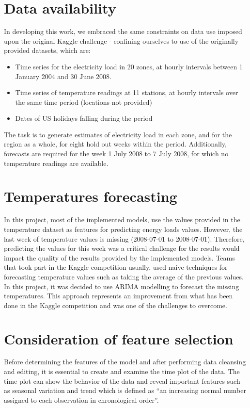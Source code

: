 \documentclass{article} %
\begin{document}
\section*{Data availability}
In developing this work, we embraced the same constraints on data use imposed upon the original Kaggle challenge - confining ourselves to use of the originally provided datasets, which are:
\begin{itemize}
\item Time series for the electricity load in 20 zones, at hourly intervals between 1 January 2004 and 30 June 2008.
\item Time series of temperature readings at 11 stations, at hourly intervals over the same time period (locations not provided)
\item Dates of US holidays falling during the period
\end{itemize}
The task is to generate estimates of electricity load in each zone, and for the region as a whole, for eight hold out weeks within the period.  Additionally, forecasts are required for the week 1 July 2008 to 7 July 2008, for which no temperature readings are available.

\section*{Temperatures forecasting}
In this project, most of the implemented models, use the values provided in the temperature dataset as features for predicting energy loads values. However, the last week of temperature values is missing (2008-07-01 to 2008-07-01). Therefore, predicting the values for this week was a critical challenge for the results would impact the quality of the results provided by the implemented models.
Teams that took part in the Kaggle competition usually, used naive techniques for forecasting temperature values such as taking the average of the previous values. In this project, it was decided to use ARIMA modelling to forecast the missing temperatures. This approach represents an improvement from what has been done in the Kaggle competition and was one of the challenges to overcome.

\section*{Consideration of feature selection}
Before determining the features of the model and after performing data cleansing and editing, it is essential to create and examine the time plot of the data. The time plot can show the behavior of the data and reveal important features such as seasonal variation and trend which is defined as “an increasing normal number assigned to each observation in chronological order”.
\end{document}
